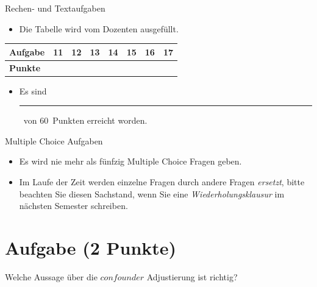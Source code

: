 \documentclass[a4paper, 10pt]{scrartcl}\usepackage[]{graphicx}\usepackage[]{color}
\def\textpoints{60}
\begin{document}
\begin{graybox}{Rechen- und Textaufgaben}
  \begin{itemize}
  \item Die Tabelle wird vom Dozenten ausgefüllt.
  \end{itemize}
  \begin{center}
    \large
    \begin{tabular}{|l|c|c|c|c|c|c|c|}
      \hline
      \textbf{Aufgabe} & 11 & 12 & 13 & 14 & 15 & 16 & 17 \strut\\
      \hline
      \textbf{Punkte} & \phantom{1111}  & \phantom{1212}  & \phantom{1313}  & \phantom{1414}  & \phantom{1515}  & \phantom{1616}  & \phantom{1717}
                                                                                                                                    \strut\\
      \hline
  \end{tabular}
\end{center}
\begin{itemize}
\item Es sind \rule[0ex]{2em}{.4pt}\, von \textpoints\, Punkten erreicht worden.
\end{itemize}
\end{graybox}

\clearpage
\begin{graybox}{Multiple Choice Aufgaben}
  \begin{itemize}
  \item Es wird nie mehr als fünfzig Multiple Choice Fragen geben.
  \item Im Laufe der Zeit werden einzelne Fragen durch andere Fragen \textit{ersetzt}, bitte beachten Sie diesen Sachstand, wenn Sie eine \textit{Wiederholungsklausur} im nächsten Semester schreiben. 
  \end{itemize}
\end{graybox}
    

\section{Aufgabe \hfill (2 Punkte)}



Welche Aussage {\"u}ber die \textbf{$confounder$} Adjustierung ist richtig?
\end{document}
